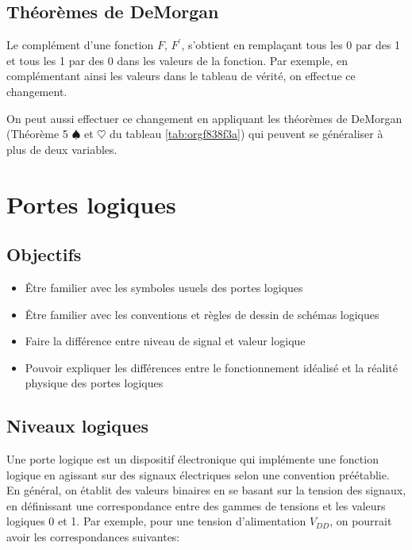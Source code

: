 \documentclass[11pt]{article}
\begin{document}
\subsection{Théorèmes de DeMorgan}
\label{sec:org4aec9c9}

Le complément d'une fonction \(F\), \(F^\prime\), s'obtient en
remplaçant tous les 0 par des 1 et tous les 1 par des 0 dans les
valeurs de la fonction. Par exemple, en complémentant ainsi les
valeurs dans le tableau de vérité, on effectue ce changement.

On peut aussi effectuer ce changement en appliquant les théorèmes de
DeMorgan (Théorème 5 \(\spadesuit\) et \(\heartsuit\) du tableau \ref{tab:orgf838f3a}) qui
peuvent se généraliser à plus de deux variables.

\section{Portes logiques}
\label{sec:orgb62dd21}

\subsection{Objectifs}
\label{sec:org89a1eed}
\begin{itemize}
\item Être familier avec les symboles usuels des portes logiques
\item Être familier avec les conventions et règles de dessin de schémas
logiques
\item Faire la différence entre niveau de signal et valeur logique
\item Pouvoir expliquer les différences entre le fonctionnement idéalisé
et la réalité physique des portes logiques
\end{itemize}

\subsection{Niveaux logiques}
\label{sec:org48fb14e}

Une porte logique est un dispositif électronique qui implémente une
fonction logique en agissant sur des signaux électriques selon une
convention préétablie. En général, on établit des valeurs binaires en
se basant sur la tension des signaux, en définissant une
correspondance entre des gammes de tensions et les valeurs logiques 0
et 1. Par exemple, pour une tension d'alimentation \(V_{DD}\), on
pourrait avoir les correspondances suivantes:
\end{document}
